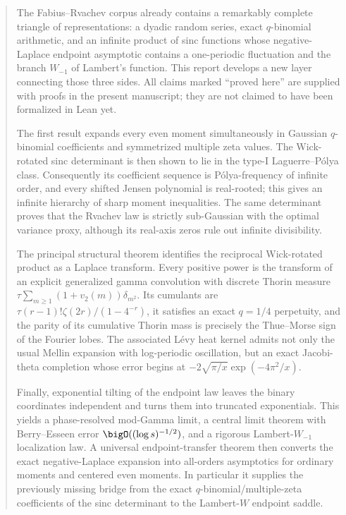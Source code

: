 \documentclass[11pt]{article}
\numberwithin{equation}{section}
\theoremstyle{definition}
\theoremstyle{remark}
\begin{document}
\begin{abstract}
The Fabius--Rvachev corpus already contains a remarkably complete triangle of
representations: a dyadic random series, exact $q$-binomial arithmetic, and an
infinite product of sinc functions whose negative-Laplace endpoint asymptotic
contains a one-periodic fluctuation and the branch $W_{-1}$ of Lambert's
function.  This report develops a new layer connecting those three sides.
All claims marked ``proved here'' are supplied with proofs in the present
manuscript; they are not claimed to have been formalized in Lean yet.

The first result expands every even moment simultaneously in Gaussian
$q$-binomial coefficients and symmetrized multiple zeta values.  The Wick-rotated
sinc determinant is then shown to lie in the type-I Laguerre--P\'olya class.
Consequently its coefficient sequence is P\'olya-frequency of infinite order,
and every shifted Jensen polynomial is real-rooted; this gives an infinite
hierarchy of sharp moment inequalities.  The same determinant proves that the
Rvachev law is strictly sub-Gaussian with the optimal variance proxy, although
its real-axis zeros rule out infinite divisibility.

The principal structural theorem identifies the reciprocal Wick-rotated
product as a Laplace transform.  Every positive power is the transform of an
explicit generalized gamma convolution with discrete Thorin measure
$\tau\sum_{m\ge1}(1+v_2(m))\delta_{m^2}$.  Its cumulants are
$\tau(r-1)!\zeta(2r)/(1-4^{-r})$, it satisfies an exact $q=1/4$ perpetuity, and
the parity of its cumulative Thorin mass is precisely the Thue--Morse sign of
the Fourier lobes.  The associated L\'evy heat kernel admits not only the usual
Mellin expansion with log-periodic oscillation, but an exact Jacobi-theta
completion whose error begins at
$-2\sqrt{\pi/x}\exp(-4\pi^2/x)$.

Finally, exponential tilting of the endpoint law leaves the binary coordinates
independent and turns them into truncated exponentials.  This yields a
phase-resolved mod-Gamma limit, a central limit theorem with Berry--Esseen error
$\bigO((\log s)^{-1/2})$, and a rigorous Lambert-$W_{-1}$ localization law.  A
universal endpoint-transfer theorem then converts the exact negative-Laplace
expansion into all-orders asymptotics for ordinary moments and centered even
moments.  In particular it supplies the previously missing bridge from the
exact $q$-binomial/multiple-zeta coefficients of the sinc determinant to the
Lambert-$W$ endpoint saddle.
\end{abstract}
\end{document}
